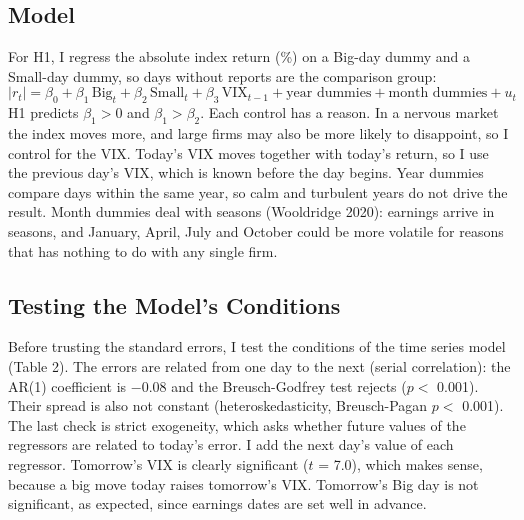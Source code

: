 \documentclass[preprint,letterpaper,11pt,authoryear]{elsarticle}
\begin{document}
\subsection{Model}
For H1, I regress the absolute index return (\%) on a Big-day dummy and a Small-day dummy, so days without reports are the comparison group:
\begin{equation}
|r_t| = \beta_0 + \beta_1\,\text{Big}_t + \beta_2\,\text{Small}_t + \beta_3\,\text{VIX}_{t-1} + \text{year dummies} + \text{month dummies} + u_t
\end{equation}
H1 predicts $\beta_1 > 0$ and $\beta_1 > \beta_2$. Each control has a reason. In a nervous market the index moves more, and large firms may also be more likely to disappoint, so I control for the VIX. Today's VIX moves together with today's return, so I use the previous day's VIX, which is known before the day begins. Year dummies compare days within the same year, so calm and turbulent years do not drive the result. Month dummies deal with seasons (Wooldridge 2020): earnings arrive in seasons, and January, April, July and October could be more volatile for reasons that has nothing to do with any single firm.

\subsection{Testing the Model's Conditions}
Before trusting the standard errors, I test the conditions of the time series model (Table 2). The errors are related from one day to the next (serial correlation): the AR(1) coefficient is $-$0.08 and the Breusch-Godfrey test rejects ($p <$ 0.001). Their spread is also not constant (heteroskedasticity, Breusch-Pagan $p <$ 0.001). The last check is strict exogeneity, which asks whether future values of the regressors are related to today's error. I add the next day's value of each regressor. Tomorrow's VIX is clearly significant ($t$ = 7.0), which makes sense, because a big move today raises tomorrow's VIX. Tomorrow's Big day is not significant, as expected, since earnings dates are set well in advance.
\end{document}

